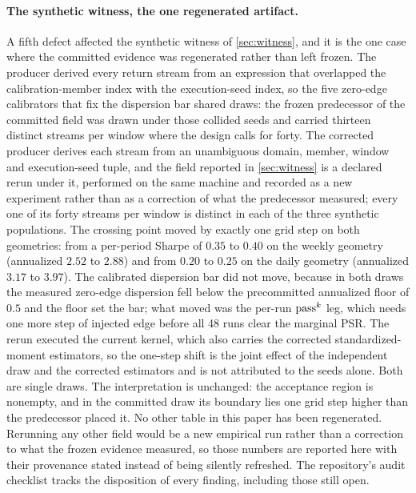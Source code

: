 \paragraph{The synthetic witness, the one regenerated artifact.} A fifth defect affected the synthetic witness of \cref{sec:witness}, and it is the one case where the committed evidence was regenerated rather than left frozen. The producer derived every return stream from an expression that overlapped the calibration-member index with the execution-seed index, so the five zero-edge calibrators that fix the dispersion bar shared draws: the frozen predecessor of the committed field was drawn under those collided seeds and carried thirteen distinct streams per window where the design calls for forty. The corrected producer derives each stream from an unambiguous domain, member, window and execution-seed tuple, and the field reported in \cref{sec:witness} is a declared rerun under it, performed on the same machine and recorded as a new experiment rather than as a correction of what the predecessor measured; every one of its forty streams per window is distinct in each of the three synthetic populations. The crossing point moved by exactly one grid step on both geometries: from a per-period Sharpe of $0.35$ to $0.40$ on the weekly geometry (annualized $2.52$ to $2.88$) and from $0.20$ to $0.25$ on the daily geometry (annualized $3.17$ to $3.97$). The calibrated dispersion bar did not move, because in both draws the measured zero-edge dispersion fell below the precommitted annualized floor of $0.5$ and the floor set the bar; what moved was the per-run $\text{pass}^{k}$ leg, which needs one more step of injected edge before all 48 runs clear the marginal PSR. The rerun executed the current kernel, which also carries the corrected standardized-moment estimators, so the one-step shift is the joint effect of the independent draw and the corrected estimators and is not attributed to the seeds alone. Both are single draws. The interpretation is unchanged: the acceptance region is nonempty, and in the committed draw its boundary lies one grid step higher than the predecessor placed it. No other table in this paper has been regenerated. Rerunning any other field would be a new empirical run rather than a correction to what the frozen evidence measured, so those numbers are reported here with their provenance stated instead of being silently refreshed. The repository's audit checklist tracks the disposition of every finding, including those still open.

